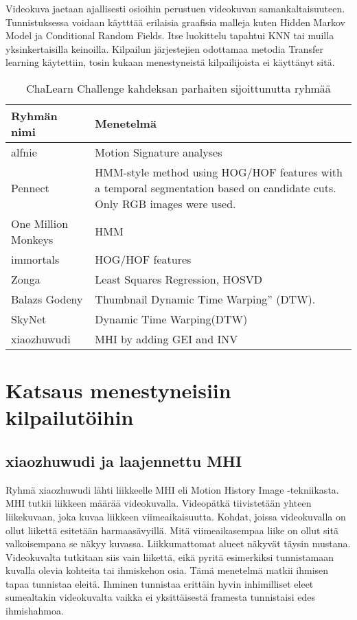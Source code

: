 Videokuva jaetaan ajallisesti osioihin perustuen videokuvan samankaltaisuuteen. Tunnistuksessa voidaan käytttää erilaisia graafisia malleja
kuten Hidden Markov Model ja Conditional Random Fields. Itse luokittelu tapahtui KNN tai muilla yksinkertaisilla keinoilla. 
Kilpailun järjestejien odottamaa metodia Transfer learning käytettiin, tosin kukaan menestyneistä kilpailijoista ei käyttänyt sitä.\\
\citep {6239178} 

\begin{table}[th]
\caption{ChaLearn Challenge kahdeksan parhaiten sijoittunutta ryhmää}
\label{table:dvbt_param}
\begin{center}
\begin{tabular}{|p{}|p{}|} 
    \hline
Ryhmän nimi & Menetelmä \\
    \hline
    \hline
alfnie & Motion Signature analyses\\ 
    \hline
Pennect & HMM-style method using HOG/HOF features
with a temporal segmentation based on candidate cuts.
Only RGB images were used.\\
    \hline
One Million Monkeys & HMM\\
    \hline
immortals & HOG/HOF features\\
    \hline
Zonga & Least Squares Regression, HOSVD\\
    \hline
Balazs Godeny & Thumbnail Dynamic Time Warping” (DTW).\\
    \hline
SkyNet & Dynamic Time Warping(DTW)\\
    \hline
xiaozhuwudi & MHI by adding GEI and INV\\
    \hline	
\end{tabular}
\end{center}
\end{table}

\newpage

\section {Katsaus menestyneisiin kilpailutöihin}

\subsection{xiaozhuwudi ja laajennettu MHI}
Ryhmä xiaozhuwudi lähti liikkeelle MHI eli Motion History Image -tekniikasta. \citep {6239179} MHI tutkii liikkeen määrää videokuvalla.
Videopätkä tiivistetään yhteen liikekuvaan, joka kuvaa liikkeen viimeaikaisuutta. Kohdat, joissa videokuvalla on ollut
liikettä esitetään harmaasävyillä. Mitä viimeaikasempaa liike on ollut sitä valkoisempana se näkyy kuvassa. Liikkumattomat
alueet näkyvät täysin mustana. Videokuvalta tutkitaan siis vain liikettä, eikä pyritä esimerkiksi tunnistamaan kuvalla olevia kohteita
tai ihmiskehon osia. Tämä menetelmä matkii ihmisen tapaa tunnistaa eleitä. Ihminen tunnistaa erittäin hyvin inhimilliset eleet  
sumealtakin videokuvalta vaikka ei yksittäisestä framesta tunnistaisi edes ihmishahmoa. \citep {910878}  \\

